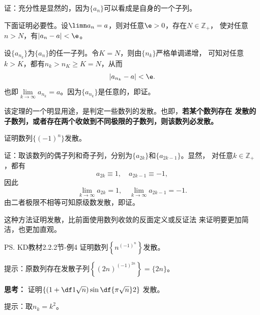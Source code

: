 证：充分性是显然的，因为$\{a_n\}$可以看成是自身的一个子列。

下面证明必要性。设$\limn a_n=a$，则对任意$\e>0$，存在$N\in\mathbb{Z}_+$，
使对任意$n>N$，有$|a_n-a|<\e$。

设$\{a_{n_k}\}$为$\{a_n\}$的任一子列。令$K=N$，则由$\{n_k\}$严格单调递增，
可知对任意$k>K$，都有$n_k>n_K\geq K=N$，从而 
$$|a_{n_k}-a|<\e.$$
也即$\lim\limits_{k\to\infty}a_{n_k}=a$。因为$\{a_{n_k}\}$是任意的，即证。
\fin
	
\bs
该定理的一个明显用途，是判定一些数列的发散。也即，{\bf 若某个数列存在
发散的子数列，或者存在两个收敛到不同极限的子数列，则该数列必发散。}

\egz 证明数列$\{(-1)^n\}$发散。

证：取该数列的偶子列和奇子列，分别为$\{a_{2k}\}$和$\{a_{2k-1}\}$。显然，
对任意$k\in\mathbb{Z}_+$，都有
$$a_{2k}\equiv 1,\quad a_{2k-1}\equiv -1,$$
因此
$$\lim\limits_{k\to\infty}a_{2k}=1,\quad
\lim\limits_{k\to\infty}a_{2k-1}=-1.$$
由二者极限不相等可知原级数发散，即证。\fin

这种方法证明发散，比前面使用数列收敛的反面定义或反证法
来证明要更加简洁，也更加直观。

\bs
\egz \ps{KD教材2.2.2节-例4}
证明数列$\left\{n^{(-1)^n}\right\}$发散。

提示：原数列存在发散子列$\left\{(2n)^{(-1)^{2n}}\right\}=\{2n\}$。

\bs
{\bf 思考：} 证明$\left\{\left(1+\df1{\sqrt n}\right)
\sin\df{\pi\sqrt n}2\right\}$
发散。

\ifhint
提示：取$n_k=k^2$。 
\fi

